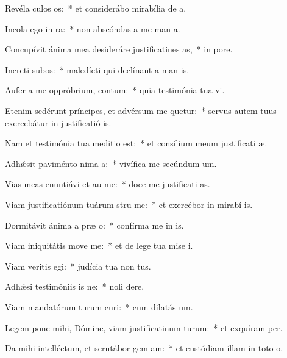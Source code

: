 \item Revéla culos os:~* et considerábo mirabília de  a.
\item Incola ego  in ra:~* non abscóndas a me man a.
\item Concupívit ánima mea desideráre justificatines as,~* in  pore.
\item Increti subos:~* maledícti qui declínant a man is.
\item Aufer a me oppróbrium,  contum:~* quia testimónia tua vi.
\item Etenim sedérunt príncipes, et advérsum me quetur:~* servus autem tuus exercebátur in justificatió is.
\item Nam et testimónia tua meditio  est:~* et consílium meum justificati æ.
\item Adhǽsit paviménto nima a:~* vivífica me secúndum  um.
\item Vias meas enuntiávi et au me:~* doce me justificati as.
\item Viam justificatiónum tuárum stru me:~* et exercébor in mirabí is.
\item Dormitávit ánima a præ o:~* confírma me in  is.
\item Viam iniquitátis move  me:~* et de lege tua mise i.
\item Viam veritis egi:~* judícia tua non  tus.
\item Adhǽsi testimóniis is ne:~* noli  dere.
\item Viam mandatórum turum curi:~* cum dilatás  um.
\item Legem pone mihi, Dómine, viam justificatinum turum:~* et exquíram  per.
\item Da mihi intelléctum, et scrutábor gem am:~* et custódiam illam in toto  o.
